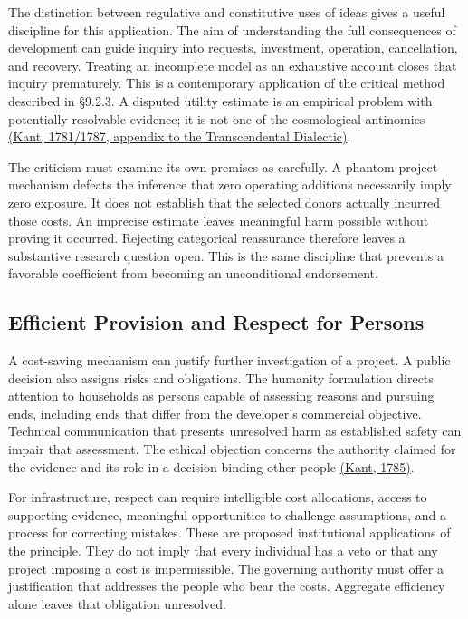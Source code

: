 The distinction between regulative and constitutive uses of ideas gives
a useful discipline for this application. The aim of understanding the
full consequences of development can guide inquiry into requests,
investment, operation, cancellation, and recovery. Treating an
incomplete model as an exhaustive account closes that inquiry
prematurely. This is a contemporary application of the critical method
described in §9.2.3. A disputed utility estimate is an empirical problem
with potentially resolvable evidence; it is not one of the cosmological
antinomies
\href{https://www.gutenberg.org/files/4280/4280-h/4280-h.htm}{(Kant,
1781/1787, appendix to the Transcendental Dialectic)}.

The criticism must examine its own premises as carefully. A
phantom-project mechanism defeats the inference that zero operating
additions necessarily imply zero exposure. It does not establish that
the selected donors actually incurred those costs. An imprecise estimate
leaves meaningful harm possible without proving it occurred. Rejecting
categorical reassurance therefore leaves a substantive research question
open. This is the same discipline that prevents a favorable coefficient
from becoming an unconditional endorsement.

\hypertarget{M09-efficient-provision-and-respect-for-persons}{%
\subsection{Efficient Provision and Respect for
Persons}\label{M09-efficient-provision-and-respect-for-persons}}

\noindent \noindent A cost-saving mechanism can justify further investigation of a
project. A public decision also assigns risks and obligations. The
humanity formulation directs attention to households as persons capable
of assessing reasons and pursuing ends, including ends that differ from
the developer's commercial objective. Technical communication that
presents unresolved harm as established safety can impair that
assessment. The ethical objection concerns the authority claimed for the
evidence and its role in a decision binding other people
\href{https://www.gutenberg.org/files/5682/5682-h/5682-h.htm}{(Kant,
1785)}.

For infrastructure, respect can require intelligible cost allocations,
access to supporting evidence, meaningful opportunities to challenge
assumptions, and a process for correcting mistakes. These are proposed
institutional applications of the principle. They do not imply that
every individual has a veto or that any project imposing a cost is
impermissible. The governing authority must offer a justification that
addresses the people who bear the costs. Aggregate efficiency alone
leaves that obligation unresolved.

